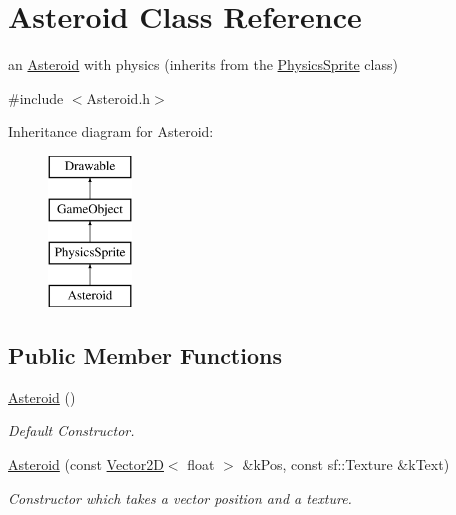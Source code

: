 \hypertarget{class_asteroid}{\section{Asteroid Class Reference}
\label{class_asteroid}
}


an \hyperlink{class_asteroid}{Asteroid} with physics (inherits from the \hyperlink{class_physics_sprite}{Physics\+Sprite} class)  




{\ttfamily \#include $<$Asteroid.\+h$>$}

Inheritance diagram for Asteroid\+:\begin{figure}[H]
\begin{center}
\leavevmode
\includegraphics[height=4.000000cm]{class_asteroid}
\end{center}
\end{figure}
\subsection*{Public Member Functions}
\begin{DoxyCompactItemize}
\item 
\hypertarget{class_asteroid_a603c2eb87a4ed26c5b3fb06e953d611c}{\hyperlink{class_asteroid_a603c2eb87a4ed26c5b3fb06e953d611c}{Asteroid} ()}\label{class_asteroid_a603c2eb87a4ed26c5b3fb06e953d611c}

\begin{DoxyCompactList}\small\item\em Default Constructor. \end{DoxyCompactList}\item 
\hyperlink{class_asteroid_a395540293c8824104326aebeb4150e24}{Asteroid} (const \hyperlink{class_vector2_d}{Vector2\+D}$<$ float $>$ \&k\+Pos, const sf\+::\+Texture \&k\+Text)
\begin{DoxyCompactList}\small\item\em Constructor which takes a vector position and a texture. \end{DoxyCompactList}\end{DoxyCompactItemize}
